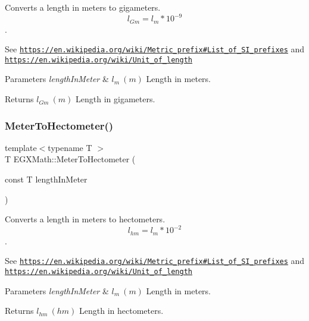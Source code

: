 Converts a length in meters to gigameters. \[ l_{Gm}=l_{m} * 10^{-9} \]. 

See \href{https://en.wikipedia.org/wiki/Metric_prefix#List_of_SI_prefixes}{\tt https\+://en.\+wikipedia.\+org/wiki/\+Metric\+\_\+prefix\#\+List\+\_\+of\+\_\+\+S\+I\+\_\+prefixes} and \href{https://en.wikipedia.org/wiki/Unit_of_length}{\tt https\+://en.\+wikipedia.\+org/wiki/\+Unit\+\_\+of\+\_\+length} 
\begin{DoxyParams}{Parameters}
{\em length\+In\+Meter} & $ l_{m}\ (m)$ Length in meters. \\
\hline
\end{DoxyParams}
\begin{DoxyReturn}{Returns}
$ l_{Gm}\ (m)$ Length in gigameters. 
\end{DoxyReturn}
\mbox{\label{group___e_g_x_math-_conversions-_length_conversions-_meter-_s_i_ga1de9cc8f2ecedbf82eacc869b0c0569c}} 
\subsubsection{\texorpdfstring{Meter\+To\+Hectometer()}{MeterToHectometer()}}
{\footnotesize\ttfamily template$<$typename T $>$ \\
T E\+G\+X\+Math\+::\+Meter\+To\+Hectometer (\begin{DoxyParamCaption}\item[{const T}]{length\+In\+Meter }\end{DoxyParamCaption})}



Converts a length in meters to hectometers. \[ l_{hm}=l_{m} * 10^{-2} \]. 

See \href{https://en.wikipedia.org/wiki/Metric_prefix#List_of_SI_prefixes}{\tt https\+://en.\+wikipedia.\+org/wiki/\+Metric\+\_\+prefix\#\+List\+\_\+of\+\_\+\+S\+I\+\_\+prefixes} and \href{https://en.wikipedia.org/wiki/Unit_of_length}{\tt https\+://en.\+wikipedia.\+org/wiki/\+Unit\+\_\+of\+\_\+length} 
\begin{DoxyParams}{Parameters}
{\em length\+In\+Meter} & $ l_{m}\ (m)$ Length in meters. \\
\hline
\end{DoxyParams}
\begin{DoxyReturn}{Returns}
$ l_{hm}\ (hm)$ Length in hectometers. 
\end{DoxyReturn}
\mbox{\label{group___e_g_x_math-_conversions-_length_conversions-_meter-_s_i_ga31b34ce8172d5b2401deb27db4ed6ece}} 
